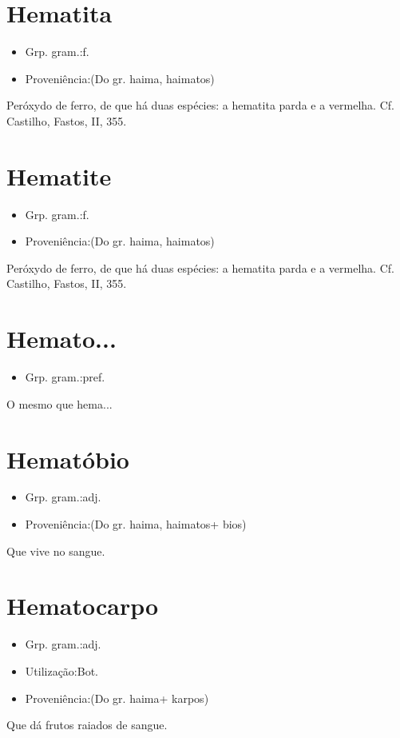 \documentclass{article}
\begin{document}
\section{Hematita}
\begin{itemize}
\item {Grp. gram.:f.}
\end{itemize}
\begin{itemize}
\item {Proveniência:(Do gr. \textunderscore haima\textunderscore , \textunderscore haimatos\textunderscore )}
\end{itemize}
Peróxydo de ferro, de que há duas espécies: a hematita parda e a vermelha. Cf. Castilho, \textunderscore Fastos\textunderscore , II, 355.
\section{Hematite}
\begin{itemize}
\item {Grp. gram.:f.}
\end{itemize}
\begin{itemize}
\item {Proveniência:(Do gr. \textunderscore haima\textunderscore , \textunderscore haimatos\textunderscore )}
\end{itemize}
Peróxydo de ferro, de que há duas espécies: a hematita parda e a vermelha. Cf. Castilho, \textunderscore Fastos\textunderscore , II, 355.
\section{Hemato...}
\begin{itemize}
\item {Grp. gram.:pref.}
\end{itemize}
O mesmo que \textunderscore hema...\textunderscore 
\section{Hematóbio}
\begin{itemize}
\item {Grp. gram.:adj.}
\end{itemize}
\begin{itemize}
\item {Proveniência:(Do gr. \textunderscore haima\textunderscore , \textunderscore haimatos\textunderscore  + \textunderscore bios\textunderscore )}
\end{itemize}
Que vive no sangue.
\section{Hematocarpo}
\begin{itemize}
\item {Grp. gram.:adj.}
\end{itemize}
\begin{itemize}
\item {Utilização:Bot.}
\end{itemize}
\begin{itemize}
\item {Proveniência:(Do gr. \textunderscore haima\textunderscore  + \textunderscore karpos\textunderscore )}
\end{itemize}
Que dá frutos raiados de sangue.
\end{document}
